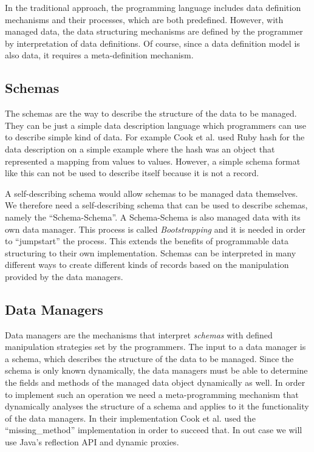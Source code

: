 In the traditional approach, the programming language includes data definition mechanisms and their processes, which are both predefined. 
However, with managed data, the data structuring mechanisms are defined by the programmer by interpretation of data definitions.
Of course, since a data definition model is also data, it requires a meta-definition mechanism.

\subsection{Schemas}\label{Schemas}
The schemas are the way to describe the structure of the data to be managed. 
They can be just a simple data description language which programmers can use to describe simple kind of data. 
For example Cook et al. \cite{loh2012managed} used Ruby hash for the data description on a simple example where the hash was an object that represented a mapping from values to values. 
However, a simple schema format like this can not be used to describe itself because it is not a record. 

A self-describing schema would allow schemas to be managed data themselves. 
We therefore need a self-describing schema that can be used to describe schemas, namely the ``Schema-Schema''. 
A Schema-Schema is also managed data with its own data manager.
This process is called \textit{Bootstrapping} and it is needed in order to ``jumpstart'' the process. 
This extends the benefits of programmable data structuring to their own implementation.
Schemas can be interpreted in many different ways to create different kinds of records based on the manipulation provided by the data managers.

\subsection{Data Managers}\label{Data Managers}
Data managers are the mechanisms that interpret \textit{schemas} with defined manipulation strategies set by the programmers. 
The input to a data manager is a schema, which describes the structure of the data to be managed.
Since the schema is only known dynamically, the data managers must be able to determine the fields and methods of the managed data object dynamically as well.
In order to implement such an operation we need a meta-programming mechanism that dynamically analyses the structure of a schema and applies to it the functionality of the data managers.
In their implementation Cook et al. \cite{loh2012managed} used the ``missing\_method'' implementation in order to succeed that.
In out case we will use Java's reflection API and dynamic proxies.

